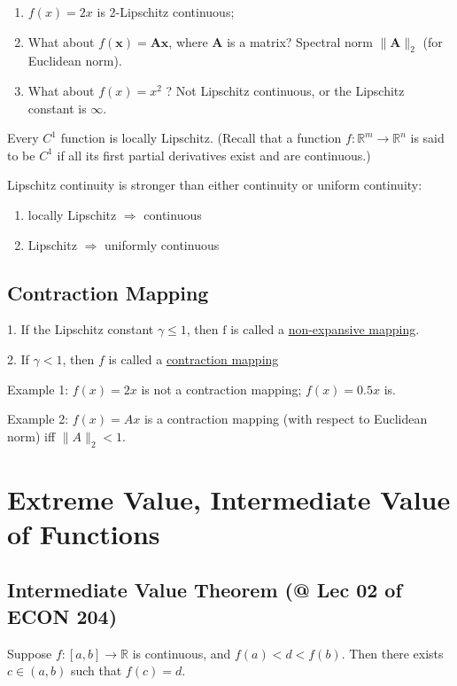 \documentclass[11pt]{elegantbook}
\begin{document}
\begin{example}[ (Lipschitz)]
    \begin{enumerate}
        \item $f(x)=2 x$ is 2-Lipschitz continuous;
        \item What about $f(\mathbf{x})=\mathbf{A x}$, where $\mathbf{A}$ is a matrix? Spectral norm $\|\mathbf{A}\|_{2}$ (for Euclidean norm).
        \item What about $f(x)=x^{2}$ ?
        Not Lipschitz continuous, or the Lipschitz constant is $\infty$.
    \end{enumerate}
\end{example}
\begin{example}
    Every $C^1$ function is locally Lipschitz. (Recall that a function $f : \mathbb{R}^m \rightarrow \mathbb{R}^n$ is said to be $C^1$ if all its first partial derivatives exist and are continuous.)
\end{example}
\begin{claim}
    Lipschitz continuity is stronger than either continuity or uniform continuity:
    \begin{enumerate}[$\circ$]
        \item locally Lipschitz $\Rightarrow$ continuous
        \item Lipschitz $\Rightarrow$ uniformly continuous
    \end{enumerate}
\end{claim}

\subsection{Contraction Mapping}
1. If the Lipschitz constant $\gamma \leq 1$, then $\mathrm{f}$ is called a \underline{non-expansive mapping}.

2. If $\gamma<1$, then $f$ is called a \underline{contraction mapping}

Example 1: $f(x)=2 x$ is not a contraction mapping; $f(x)=0.5 x$ is.

Example 2: $f(x)=A x$ is a contraction mapping (with respect to Euclidean norm) iff $\|A\|_{2}<1$.


\section{Extreme Value, Intermediate Value of Functions}
\subsection{Intermediate Value Theorem \small{(@ Lec 02 of ECON 204)}}
\begin{theorem}
    Suppose $f : [a, b] \rightarrow \mathbb{R}$ is continuous, and $f(a) < d < f(b)$. Then there exists $c \in (a, b)$ such that $f(c) = d$.
\end{theorem}
\end{document}
